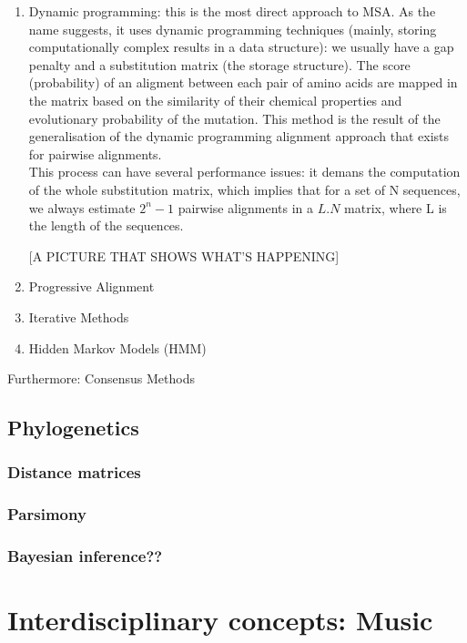 \documentclass[11pt,twoside,a4paper]{report}
\begin{document}
\begin{enumerate}
\item Dynamic programming: this is the most direct approach to MSA. As the name suggests, it uses dynamic programming techniques (mainly, storing computationally complex results in a data structure): we usually have a gap penalty and a substitution matrix (the storage structure). The score (probability) of an aligment between each pair of amino acids are mapped in the matrix based on the similarity of their chemical properties and evolutionary probability of the mutation. This method is the result of the generalisation of the dynamic programming alignment approach that exists for pairwise alignments.\\
This process can have several performance issues: it demans the computation of the whole substitution matrix, which implies that for a set of N sequences, we always estimate $2^{n}-1$ pairwise alignments in a $L.N$ matrix, where L is the length of the sequences. 

[A PICTURE THAT SHOWS WHAT'S HAPPENING]
\item Progressive Alignment
\item Iterative Methods
\item Hidden Markov Models (HMM)
\end{enumerate}

\begin{description}
\item Furthermore: Consensus Methods
\end{description}

\subsection{Phylogenetics}
\subsubsection{Distance matrices}
\subsubsection{Parsimony}
\subsubsection{Bayesian inference??}

\section{Interdisciplinary concepts: Music}
\end{document}
